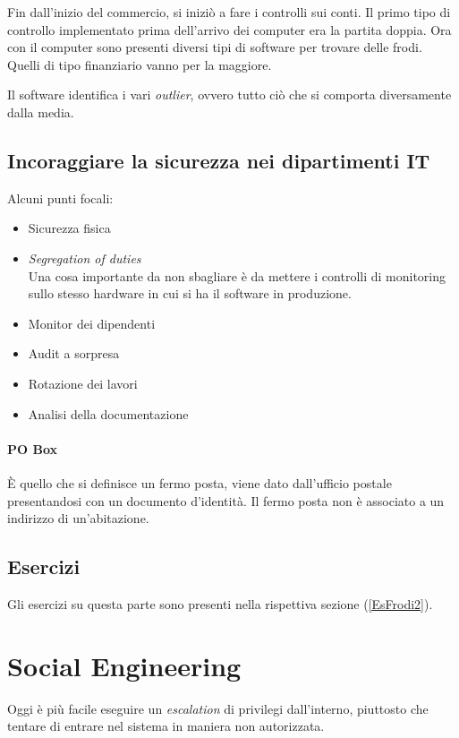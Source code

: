 Fin dall'inizio del commercio, si iniziò a fare i controlli sui conti. Il
primo tipo di controllo implementato prima dell'arrivo dei computer era la
partita doppia. Ora con il computer sono presenti diversi tipi di software
per trovare delle frodi. Quelli di tipo finanziario vanno per la maggiore.

Il software identifica i vari \textit{outlier}, ovvero tutto ciò che si
comporta diversamente dalla media.

\subsection{Incoraggiare la sicurezza nei dipartimenti IT}

Alcuni punti focali:
\begin{itemize}
  \item Sicurezza fisica
  \item \textit{Segregation of duties} \\
  Una cosa importante da non sbagliare è da mettere i controlli di monitoring
  sullo stesso hardware in cui si ha il software in produzione.
  \item Monitor dei dipendenti
  \item Audit a sorpresa
  \item Rotazione dei lavori
  \item Analisi della documentazione
\end{itemize}

\paragraph*{PO Box} %

È quello che si definisce un fermo posta, viene dato dall'ufficio postale
presentandosi con un documento d'identità. Il fermo posta non è associato a un
indirizzo di un'abitazione.

\subsection{Esercizi}

Gli esercizi su questa parte sono presenti nella rispettiva sezione
(\ref{EsFrodi2}).

\section{Social Engineering}
		
Oggi è più facile eseguire un \textit{escalation} di privilegi dall'interno,
piuttosto che tentare di entrare nel sistema in maniera non autorizzata.

